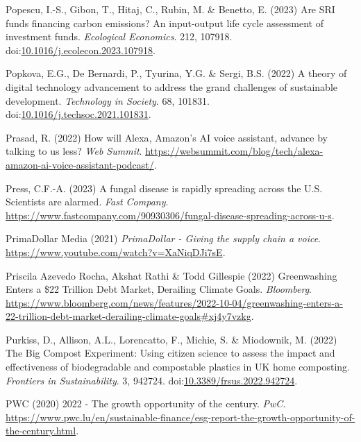 \documentclass[
  letterpaper,
  DIV=11,
  numbers=noendperiod]{scrartcl}
\newlength{\cslhangindent}
\newenvironment{CSLReferences}[2] %
 {\begin{list}{}{%
  \setlength{\itemindent}{0pt}
  \setlength{\leftmargin}{0pt}
  \setlength{\parsep}{0pt}
  \ifodd #1
   \setlength{\leftmargin}{\cslhangindent}
   \setlength{\itemindent}{-1\cslhangindent}
  \fi
  \setlength{\itemsep}{#2\baselineskip}}}
 {\end{list}}
\begin{document}
\begin{CSLReferences}{0}{1}
Popescu, I.-S., Gibon, T., Hitaj, C., Rubin, M. \& Benetto, E. (2023)
Are {SRI} funds financing carbon emissions? {An} input-output life cycle
assessment of investment funds. \emph{Ecological Economics}. 212,
107918.
doi:\href{https://doi.org/10.1016/j.ecolecon.2023.107918}{10.1016/j.ecolecon.2023.107918}.

Popkova, E.G., De Bernardi, P., Tyurina, Y.G. \& Sergi, B.S. (2022) A
theory of digital technology advancement to address the grand challenges
of sustainable development. \emph{Technology in Society}. 68, 101831.
doi:\href{https://doi.org/10.1016/j.techsoc.2021.101831}{10.1016/j.techsoc.2021.101831}.

Prasad, R. (2022) How will {Alexa}, {Amazon}'s {AI} voice assistant,
advance by talking to us less? \emph{Web Summit}.
\url{https://websummit.com/blog/tech/alexa-amazon-ai-voice-assistant-podcast/}.

Press, C.F.-A. (2023) A fungal disease is rapidly spreading across the
{U}.{S}. {Scientists} are alarmed. \emph{Fast Company}.
\url{https://www.fastcompany.com/90930306/fungal-disease-spreading-across-u-s}.

PrimaDollar Media (2021) \emph{{PrimaDollar} - {Giving} the supply chain
a voice}. \url{https://www.youtube.com/watch?v=XaNiqDJi7sE}.

Priscila Azevedo Rocha, Akshat Rathi \& Todd Gillespie (2022)
Greenwashing {Enters} a \$22 {Trillion Debt Market}, {Derailing Climate
Goals}. \emph{Bloomberg}.
\url{https://www.bloomberg.com/news/features/2022-10-04/greenwashing-enters-a-22-trillion-debt-market-derailing-climate-goals\#xj4y7vzkg}.

Purkiss, D., Allison, A.L., Lorencatto, F., Michie, S. \& Miodownik, M.
(2022) The {Big Compost Experiment}: {Using} citizen science to assess
the impact and effectiveness of biodegradable and compostable plastics
in {UK} home composting. \emph{Frontiers in Sustainability}. 3, 942724.
doi:\href{https://doi.org/10.3389/frsus.2022.942724}{10.3389/frsus.2022.942724}.

PWC (2020) {2022 - The growth opportunity of the century}. \emph{PwC}.
\url{https://www.pwc.lu/en/sustainable-finance/esg-report-the-growth-opportunity-of-the-century.html}.


\end{CSLReferences}
\end{document}
